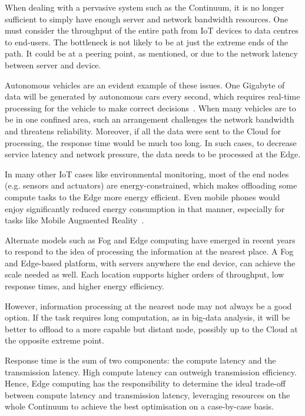When dealing with a pervasive system such as the Continuum, it is no longer sufficient to simply have enough server and network bandwidth resources. One must consider the throughput of the entire path from IoT devices to data centres to end-users. The bottleneck is not likely to be at just the extreme ends of the path. It could be at a peering point, as mentioned, or due to the network latency between server and device. 

Autonomous vehicles are an evident example of these issues. One Gigabyte of data will be generated by autonomous cars every second, which requires real-time processing for the vehicle to make correct decisions~\cite{shi2016edge}. 
When many vehicles are to be in one confined area, such an arrangement challenges the network bandwidth and threatens reliability. 
Moreover, if all the data were sent to the Cloud for processing, the response time would be much too long. 
In such cases, to decrease service latency and network pressure, the data needs to be processed at the Edge.

In many other IoT cases like environmental monitoring, most of the end nodes (e.g. sensors and actuators) are energy-constrained, which makes offloading some compute tasks to the Edge more energy efficient. 
Even mobile phones would enjoy significantly reduced energy consumption in that manner, especially for tasks like Mobile Augmented Reality~\cite{baresi2017empowering}.

Alternate models such as Fog and Edge computing \cite{fog-computing,shi2016edge} have emerged in recent years to respond to the idea of processing the information at the nearest place. 
A Fog and Edge-based platform, with servers anywhere the end device, can achieve the scale needed as well. 
Each location supports higher orders of throughput, low response times, and higher energy efficiency.

However, information processing at the nearest node may not always be a good option. 
If the task requires long computation, as in big-data analysis, it will be better to offload to a more capable but distant node, possibly up to the Cloud at the opposite extreme point. 

Response time is the sum of two components: the compute latency and the transmission latency. High compute latency can outweigh transmission efficiency. 
Hence, Edge computing has the responsibility to determine the ideal trade-off between compute latency and transmission latency, leveraging resources on the whole Continuum to achieve the best optimisation on a case-by-case basis.

